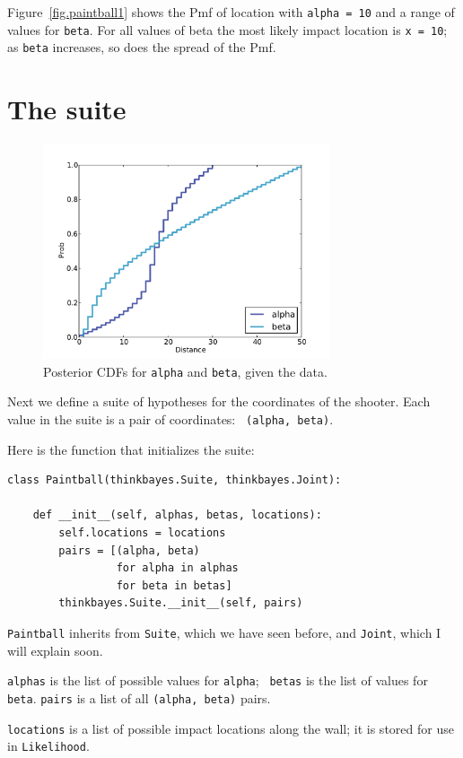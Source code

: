 \documentclass[12pt]{book}
\begin{document}
Figure~\ref{fig.paintball1} shows the Pmf of location with {\tt alpha
  = 10} and a range of values for {\tt beta}.  For all values of beta
the most likely impact location is {\tt x = 10}; as {\tt beta}
increases, so does the spread of the Pmf.


\section{The suite}

\begin{figure}
\centerline{\includegraphics[height=2.5in]{figs/paintball2.pdf}}
\caption{Posterior CDFs for {\tt alpha} and {\tt beta}, given the data.}
\label{fig.paintball2}
\end{figure}

Next we define a suite of hypotheses for the coordinates of the
shooter.  Each value in the suite is a pair of coordinates: {\tt
  (alpha, beta)}.

Here is the function that initializes the suite:

\begin{verbatim}
class Paintball(thinkbayes.Suite, thinkbayes.Joint):

    def __init__(self, alphas, betas, locations):
        self.locations = locations
        pairs = [(alpha, beta) 
                 for alpha in alphas 
                 for beta in betas]
        thinkbayes.Suite.__init__(self, pairs)
\end{verbatim}

{\tt Paintball} inherits from {\tt Suite}, which we have seen before,
and {\tt Joint}, which I will explain soon.

{\tt alphas} is the list of possible values for {\tt alpha}; {\tt
  betas} is the list of values for {\tt beta}.  {\tt pairs} is a list
of all {\tt (alpha, beta)} pairs.

{\tt locations} is a list of possible impact locations along
the wall; it is stored for use in {\tt Likelihood}.
\end{document}
